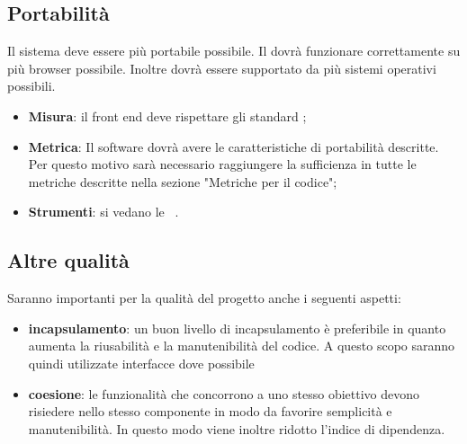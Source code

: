 \documentclass[../PianoDiQualifica.tex]{subfiles}
\begin{document}
	\subsection{Portabilità}
		Il sistema deve essere più portabile possibile. Il  dovrà funzionare correttamente su più browser possibile. Inoltre dovrà essere supportato da più sistemi operativi possibili.
		\begin{itemize}
			\item \textbf{Misura}: il front end deve rispettare gli standard ;
			\item \textbf{Metrica}: Il software dovrà avere le caratteristiche di portabilità descritte. Per questo motivo sarà necessario raggiungere la sufficienza in tutte le metriche descritte nella sezione "Metriche per il codice";
			\item \textbf{Strumenti}: si vedano le \normediprogettov\ .	
		\end{itemize}
	\subsection{Altre qualità}
		Saranno importanti per la qualità del progetto anche i seguenti aspetti:
		\begin{itemize}
				\item \textbf{incapsulamento}: un buon livello di incapsulamento è preferibile in quanto aumenta la riusabilità e la manutenibilità del codice. A questo scopo saranno quindi utilizzate interfacce dove possibile
				\item \textbf{coesione}: le funzionalità che concorrono a uno stesso obiettivo devono risiedere nello stesso componente in modo da favorire semplicità e manutenibilità. In questo modo viene inoltre ridotto l'indice di dipendenza.
		\end{itemize}
\end{document}
